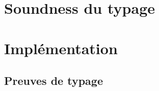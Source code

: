 \documentclass[frenchb]{scrartcl}
\newcommand{\τ}{\ensuremath{\tau}}
\begin{document}
\section{Soundness du typage}

\section{Implémentation}

\begin{appendices}
  \section{Preuves de typage}
\end{appendices}



\end{document}
